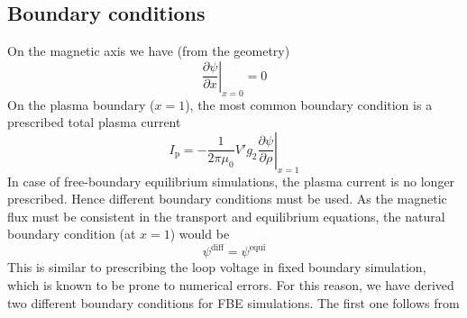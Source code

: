 \subsection{Boundary conditions}
On the magnetic axis we have (from the geometry)
\begin{equation}
{\left. {\frac{{\partial \psi }}{{\partial x }}} \right|_{x = 0}} = 0
\end{equation}
On the plasma boundary ($x=1$), the most common boundary condition is 
a prescribed total plasma current
\begin{equation}
{I_{\text{p}}} = {\left. { - \frac{1}{{2\pi {\mu _0}}}V'{g_2}\frac{{\partial \psi }}{{\partial \rho }}} \right|_{x = 1}}
\end{equation}
In case of free-boundary equilibrium simulations, the plasma current is no longer prescribed.
Hence different boundary conditions must be used. As the magnetic flux must be consistent
in the transport and equilibrium equations, the natural boundary condition (at $x=1$) would be
\begin{equation}
\label{eq:bcflux}
{\psi ^{{\text{diff}}}} = {\psi ^{{\text{equi}}}}
\end{equation}
This is similar to prescribing the loop voltage in fixed boundary simulation,
which is known to be prone to numerical errors. For this reason, we have derived two
different boundary conditions for FBE simulations. The first one follows from
